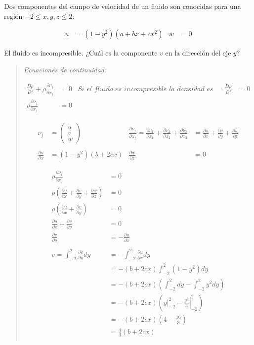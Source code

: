 \documentclass[a4paper,10pt,twoside,final,spanish]{article}
\begin{document}
Dos componentes del campo de velocidad de un fluido son conocidas para una región $-2\leq x,y,z\leq 2$:

\begin{align*}
u &= (1-y^{2})(a+bx+cx^{2}) & w &= 0
\end{align*} 

El fluido es incompresible. ¿Cuál es la componente $v$ en la dirección del eje $y$?

\dotfill

\begin{quote}

\textit{Ecuaciones de continuidad:}

\begin{align*}
\frac{D\rho}{Dt}+\rho\frac{\partial\nu_{j}}{\partial x_{j}} &= 0
& \textit{Si el fluido es incompresible la densidad es constante.}
&& \frac{D\rho}{Dt} &= 0 \\
\rho\frac{\partial\nu_{j}}{\partial x_{j}} &= 0
\end{align*}

\begin{align*}
\nu_{j} &= \begin{pmatrix}
u \\
v \\
w
\end{pmatrix}
& \frac{\partial\nu_{j}}{\partial x_{j}}
= \frac{\partial\nu_{1}}{\partial x_{1}}
+\frac{\partial\nu_{2}}{\partial x_{2}}
+\frac{\partial\nu_{3}}{\partial x_{3}}
&= \frac{\partial u}{\partial x}
+\frac{\partial v}{\partial y}
+\frac{\partial w}{\partial z} \\ \\
\frac{\partial u}{\partial x} &= (1-y^{2})(b+2cx)
& \frac{\partial w}{\partial z} &= 0
\end{align*}

\begin{align*}
\rho\frac{\partial\nu_{j}}{\partial x_{j}} &= 0 \\
\rho\left(\frac{\partial u}{\partial x}+\frac{\partial v}{\partial y}
+\frac{\partial w}{\partial z}\right) &= 0 \\
\rho\left(\frac{\partial u}{\partial x}+\frac{\partial v}{\partial y}\right) &= 0 \\
\frac{\partial u}{\partial x}+\frac{\partial v}{\partial y} &= 0 \\
\frac{\partial v}{\partial y} &= -\frac{\partial u}{\partial x} \\ \\
v=\int_{-2}^{2}\frac{\partial v}{\partial y}dy
&= -\int_{-2}^{2}\frac{\partial u}{\partial x}dy \\
&= -(b+2cx)\int_{-2}^{2}(1-y^{2})dy \\
&= -(b+2cx)\left(\int_{-2}^{2}dy-\int_{-2}^{2}y^{2}dy\right) \\
&= -(b+2cx)\left(\left.y\right|_{-2}^{2}-\left.\frac{y^{3}}{3}\right|_{-2}^{2}\right) \\
&= -(b+2cx)\left(4-\frac{16}{3}\right) \\
&= \frac{4}{3}(b+2cx) \\
\end{align*}

\end{quote}
\end{document}
